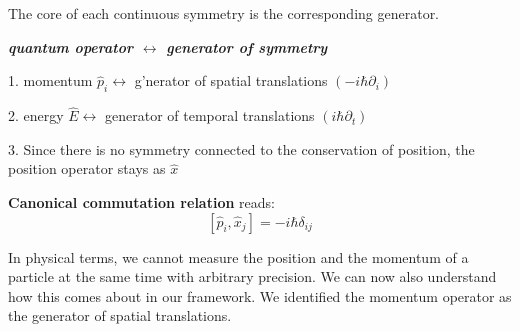\begin{qt}
    \begin{center}
        The core of each continuous symmetry is the corresponding generator.
        
        \textit{\textbf{quantum operator $\leftrightarrow$ generator of symmetry}}
    \end{center}
\end{qt}
\begin{qt}
\begin{center}
    1. momentum $\hat{p}_{i} \leftrightarrow$ g'nerator of spatial translations $\left(-i \hbar \partial_{i}\right)$
    
    2. energy $\hat{E} \leftrightarrow$ generator of temporal translations $\left(i \hbar \partial_{t}\right)$
    
    3. Since there is no symmetry connected to the conservation of position, the position operator stays as $\hat{x}$
\end{center}
\end{qt}
\begin{qt}
\textbf{Canonical commutation relation} reads:
\begin{equation}
\left[\hat{p}_{i}, \hat{x}_{j}\right]=-i \hbar \delta_{i j}
\end{equation}
\end{qt}
In physical terms, we cannot measure the position and the momentum of a particle at the same time with arbitrary precision. We can now also understand how this comes about in our framework. We identified the momentum
operator as the generator of spatial translations.